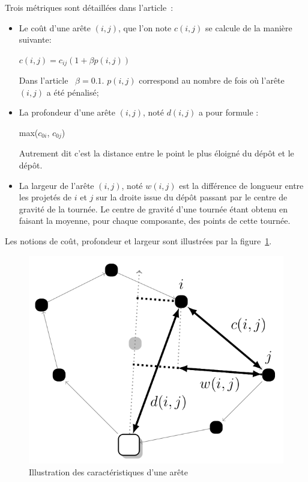\documentclass[a4paper,11pt]{article}%
\begin{document}
Trois métriques sont détaillées dans l'article~\cite{Sorensen_2017}:
\begin{itemize}
\item Le coût d'une arête $(i,j)$, que l'on note $c(i,j)$ se calcule de la manière suivante:

\begin{center}
$c(i,j) = c_{ij}(1 + \beta p(i,j))$ 
\end{center}

Dans l'article~\cite{Sorensen_2017} $\beta = 0.1$. $p(i,j)$ correspond au nombre de fois où l'arête $(i,j)$ a été pénalisé;
\item La profondeur d'une arête $(i,j)$, noté $d(i,j)$ a pour formule :

\begin{center}
max($c_{0i}$, $c_{0j}$)
\end{center}

Autrement dit c'est la distance entre le point le plus éloigné du dépôt et le dépôt.
\item La largeur de l'arête $(i,j)$, noté $w(i,j)$ est la différence de longueur entre les projetés de $i$ et $j$ sur la droite issue du dépôt passant par le centre de gravité de la tournée. Le centre de gravité d'une tournée étant obtenu en faisant la moyenne, pour chaque composante, des points de cette tournée.
\end{itemize}

Les notions de coût, profondeur et largeur sont illustrées par la figure~\ref{metrics}. 

\begin{figure}
\centering
\includegraphics[scale=0.3]{metrics_big.png}
\caption{Illustration des caractéristiques d'une arête}
\label{metrics}
\end{figure}
\end{document}

